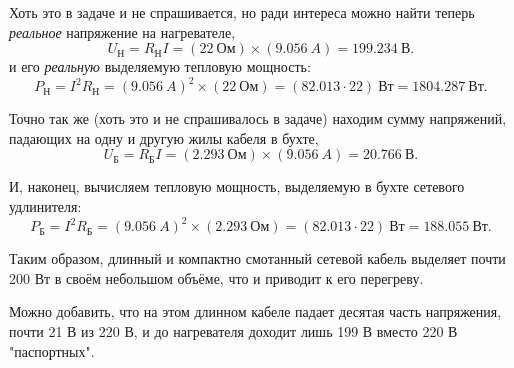 \documentclass[letterpaper,twoside,12pt]{article}
\begin{document}
Хоть это в задаче и не спрашивается, но ради интереса можно найти теперь \emph{реальное} напряжение на нагревателе,
\begin{equation}
  \label{г_nagr}
  U_\text{Н} = R_\text{Н} I = (22~\text{Ом}) \times (9.056~A) = 199.234~\text{В}.
\end{equation}
и его \emph{реальную} выделяемую тепловую мощность:
\begin{equation}
  \label{p_nagr}
  P_\text{Н} = I^2 R_\text{Н} = (9.056~A)^2 \times (22~\text{Ом}) = (82.013 \cdot 22)~\text{Вт} = 1804.287~\text{Вт}.
\end{equation}

Точно так же (хоть это и не спрашивалось в задаче) находим сумму напряжений, падающих на одну и другую жилы кабеля в бухте,
\begin{equation}
  \label{u_buh}
  U_\text{Б} = R_\text{Б} I = (2.293~\text{Ом}) \times (9.056~A) = 20.766~\text{В}.
\end{equation}

И, наконец, вычисляем тепловую мощность, выделяемую  в бухте сетевого удлинителя:
\begin{equation}
  \label{p_buh}
  P_\text{Б} = I^2 R_\text{Б} = (9.056~A)^2 \times (2.293~\text{Ом}) = (82.013 \cdot 22)~\text{Вт} = 188.055~\text{Вт}. 
\end{equation}

Таким образом, длинный и компактно смотанный сетевой кабель выделяет почти 200 Вт в своём небольшом объёме, что и приводит к его перегреву.

Можно добавить, что на этом длинном кабеле падает десятая часть напряжения, почти 21 В из 220 В, и до нагревателя доходит лишь 199 В вместо 220 В "паспортных".
\end{document}
